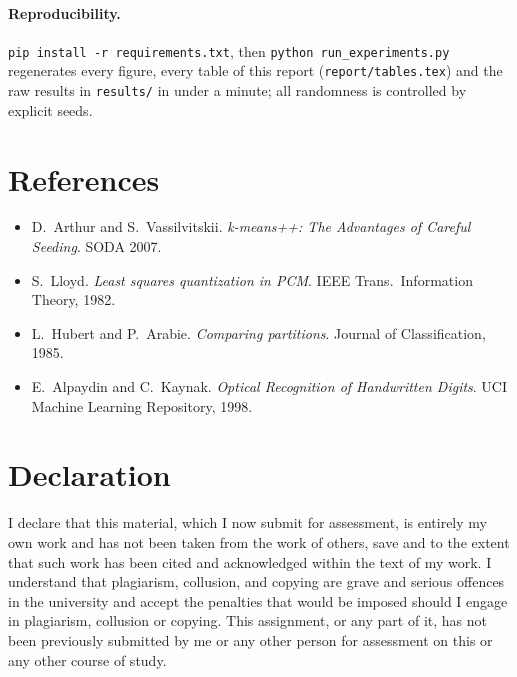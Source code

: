 \documentclass[11pt,a4paper]{article}
\begin{document}
\paragraph{Reproducibility.} \texttt{pip install -r requirements.txt}, then
\texttt{python run\_experiments.py} regenerates every figure, every table of this
report (\texttt{report/tables.tex}) and the raw results in \texttt{results/} in
under a minute; all randomness is controlled by explicit seeds.

\section*{References}
\begin{itemize}
\item D.\ Arthur and S.\ Vassilvitskii. \emph{k-means++: The Advantages of Careful
Seeding}. SODA 2007.
\item S.\ Lloyd. \emph{Least squares quantization in PCM}. IEEE Trans.\
Information Theory, 1982.
\item L.\ Hubert and P.\ Arabie. \emph{Comparing partitions}. Journal of
Classification, 1985.
\item E.\ Alpaydin and C.\ Kaynak. \emph{Optical Recognition of Handwritten Digits}.
UCI Machine Learning Repository, 1998.
\end{itemize}

\section*{Declaration}
I declare that this material, which I now submit for assessment, is entirely my
own work and has not been taken from the work of others, save and to the extent
that such work has been cited and acknowledged within the text of my work. I
understand that plagiarism, collusion, and copying are grave and serious offences
in the university and accept the penalties that would be imposed should I engage
in plagiarism, collusion or copying. This assignment, or any part of it, has not
been previously submitted by me or any other person for assessment on this or any
other course of study.
\end{document}
